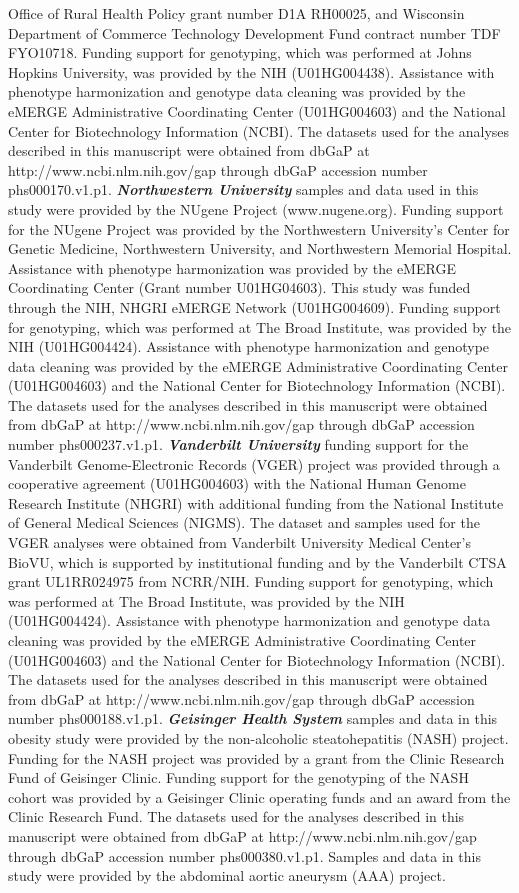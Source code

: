 \documentclass[12pt]{article}
\begin{document}
Office of Rural Health Policy grant number D1A RH00025, and Wisconsin Department of Commerce Technology Development Fund contract number TDF FYO10718. Funding support for genotyping, which was performed at Johns Hopkins University, was provided by the NIH (U01HG004438). Assistance with phenotype harmonization and genotype data cleaning was provided by the eMERGE Administrative Coordinating Center (U01HG004603) and the National Center for Biotechnology Information (NCBI). The datasets used for the analyses described in this manuscript were obtained from dbGaP at http://www.ncbi.nlm.nih.gov/gap through dbGaP accession number phs000170.v1.p1. \textbf{\textit{Northwestern University}} samples and data used in this study were provided by the NUgene Project (www.nugene.org). Funding support for the NUgene Project was provided by the Northwestern University’s Center for Genetic Medicine, Northwestern University, and Northwestern Memorial Hospital. Assistance with phenotype harmonization was provided by the eMERGE Coordinating Center (Grant number U01HG04603). This study was funded through the NIH, NHGRI eMERGE Network (U01HG004609). Funding support for genotyping, which was performed at The Broad Institute, was provided by the NIH (U01HG004424). Assistance with phenotype harmonization and genotype data cleaning was provided by the eMERGE Administrative Coordinating Center (U01HG004603) and the National Center for Biotechnology Information (NCBI). The datasets used for the analyses described in this manuscript were obtained from dbGaP at http://www.ncbi.nlm.nih.gov/gap through dbGaP accession number phs000237.v1.p1. \textbf{\textit{Vanderbilt University}} funding support for the Vanderbilt Genome-Electronic Records (VGER) project was provided through a cooperative agreement (U01HG004603) with the National Human Genome Research Institute (NHGRI) with additional funding from the National Institute of General Medical Sciences (NIGMS). The dataset and samples used for the VGER analyses were obtained from Vanderbilt University Medical Center's BioVU, which is supported by institutional funding and by the Vanderbilt CTSA grant UL1RR024975 from NCRR/NIH. Funding support for genotyping, which was performed at The Broad Institute, was provided by the NIH (U01HG004424). Assistance with phenotype harmonization and genotype data cleaning was provided by the eMERGE Administrative Coordinating Center (U01HG004603) and the National Center for Biotechnology Information (NCBI). The datasets used for the analyses described in this manuscript were obtained from dbGaP at http://www.ncbi.nlm.nih.gov/gap through dbGaP accession number phs000188.v1.p1. \textbf{\textit{Geisinger Health System}} samples and data in this obesity study were provided by the non-alcoholic steatohepatitis (NASH) project. Funding for the NASH project was provided by a grant from the Clinic Research Fund of Geisinger Clinic. Funding support for the genotyping of the NASH cohort was provided by a Geisinger Clinic operating funds and an award from the Clinic Research Fund. The datasets used for the analyses described in this manuscript were obtained from dbGaP at http://www.ncbi.nlm.nih.gov/gap through dbGaP accession number phs000380.v1.p1. Samples and data in this study were provided by the abdominal aortic aneurysm (AAA) project. 
\end{document}
